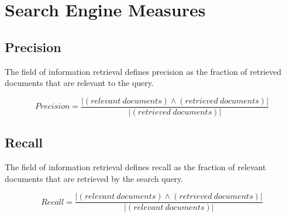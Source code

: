 \documentclass[a4paper, 11pt]{article}
\begin{document}
\section*{Search Engine Measures}
\newcommand{\cfplus}{\mathbin{\genfrac{}{}{0pt}{}{}{+}}}

\subsection*{Precision}
The field of information retrieval defines precision as the fraction of retrieved documents that are relevant to the query. 

\begin{equation*}
Precision
=\frac{|(relevant\ documents) \land (retrieved\ documents)|}{|(retrieved\ documents)|}
\end{equation*}

\subsection*{Recall}
The field of information retrieval defines recall as the fraction of relevant documents that are retrieved by the search query. 

\begin{equation*}
Recall
=\frac{|(relevant\ documents) \land (retrieved\ documents)|}{|(relevant\ documents)|}
\end{equation*}
\clearpage
\end{document}
